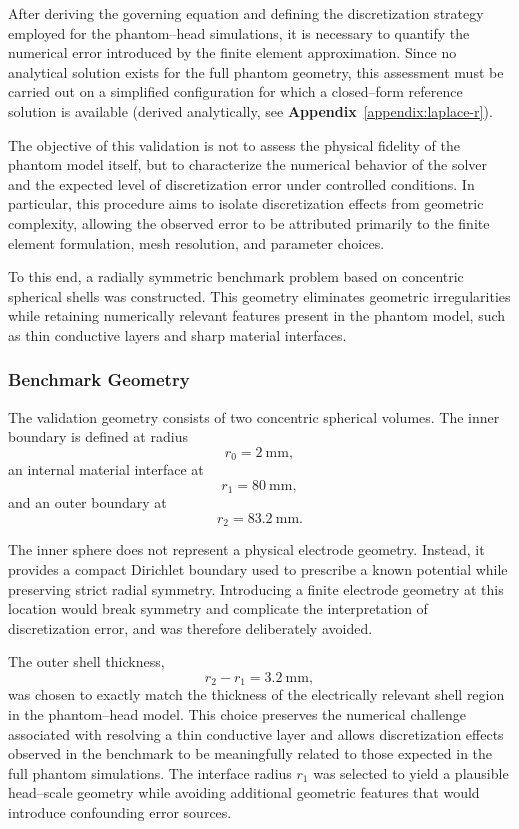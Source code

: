 After deriving the governing equation and defining the discretization strategy employed for the phantom--head simulations,
it is necessary to quantify the numerical error introduced by the finite element approximation. Since no analytical solution
exists for the full phantom geometry, this assessment must be carried out on a simplified configuration for which a closed--form
reference solution is available (derived analytically, see \textbf{Appendix}~\ref{appendix:laplace-r}).


The objective of this validation is not to assess the physical fidelity of the phantom model itself, but to characterize the numerical behavior of the solver and the expected level of discretization error under controlled conditions. In particular, this procedure aims to isolate discretization effects from geometric complexity, allowing the observed error to be attributed primarily to the finite element formulation, mesh resolution, and parameter choices.

To this end, a radially symmetric benchmark problem based on concentric spherical shells was constructed. This geometry eliminates geometric irregularities while retaining numerically relevant features present in the phantom model, such as thin conductive layers and sharp material interfaces.

\subsubsection{Benchmark Geometry}

The validation geometry consists of two concentric spherical volumes. The inner boundary is defined at radius
\[
r_0 = 2~\mathrm{mm},
\]
an internal material interface at
\[
r_1 = 80~\mathrm{mm},
\]
and an outer boundary at
\[
r_2 = 83.2~\mathrm{mm}.
\]

The inner sphere does not represent a physical electrode geometry. Instead, it provides a compact Dirichlet boundary used to prescribe a known potential while preserving strict radial symmetry. Introducing a finite electrode geometry at this location would break symmetry and complicate the interpretation of discretization error, and was therefore deliberately avoided.

The outer shell thickness,
\[
r_2 - r_1 = 3.2~\mathrm{mm},
\]
was chosen to exactly match the thickness of the electrically relevant shell region in the phantom--head model. This choice preserves the numerical challenge associated with resolving a thin conductive layer and allows discretization effects observed in the benchmark to be meaningfully related to those expected in the full phantom simulations. The interface radius $r_1$ was selected to yield a plausible head--scale geometry while avoiding additional geometric features that would introduce confounding error sources.

